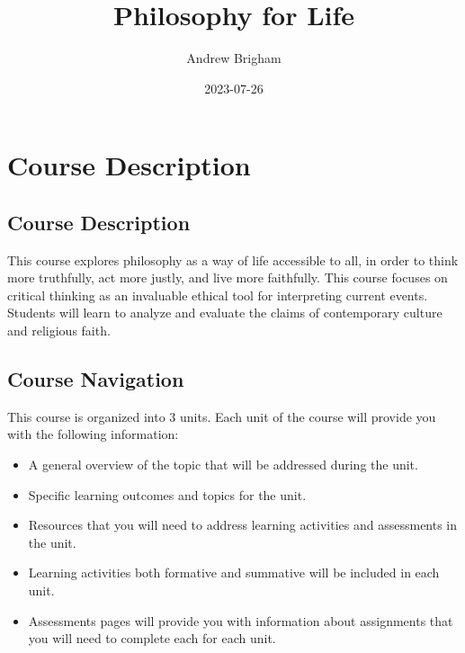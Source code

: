 \documentclass[
]{book}
\title{Philosophy for Life}
\author{Andrew Brigham}
\date{2023-07-26}
\providecommand{\tightlist}{%
  \setlength{\itemsep}{0pt}\setlength{\parskip}{0pt}}
\begin{document}
\maketitle

{
\setcounter{tocdepth}{1}
\tableofcontents
}
\hypertarget{course-description}{%
\chapter*{Course Description}\label{course-description}}

\hypertarget{course-description-1}{%
\section*{Course Description}\label{course-description-1}}

This course explores philosophy as a way of life accessible to all, in order to think more truthfully, act more justly, and live more faithfully. This course focuses on critical thinking as an invaluable ethical tool for interpreting current events. Students will learn to analyze and evaluate the claims of contemporary culture and religious faith.

\hypertarget{course-navigation}{%
\section*{Course Navigation}\label{course-navigation}}

This course is organized into 3 units. Each unit of the course will provide you with the following information:

\begin{itemize}
\tightlist
\item
  A general overview of the topic that will be addressed during the unit.\\
\item
  Specific learning outcomes and topics for the unit.\\
\item
  Resources that you will need to address learning activities and assessments in the unit.\\
\item
  Learning activities both formative and summative will be included in each unit.\\
\item
  Assessments pages will provide you with information about assignments that you will need to complete each for each unit.
\end{itemize}
\end{document}

